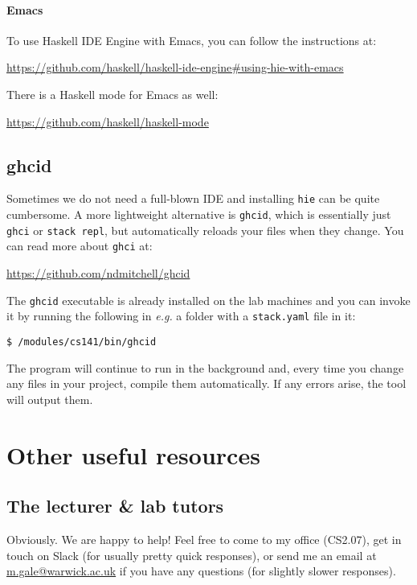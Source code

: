 \paragraph{Emacs} To use Haskell IDE Engine with Emacs, you can follow the instructions at:
\begin{center}
	\parbox{13cm}{\centering\url{https://github.com/haskell/haskell-ide-engine\#using-hie-with-emacs}}
\end{center}
There is a Haskell mode for Emacs as well:
\begin{center}
\url{https://github.com/haskell/haskell-mode}
\end{center}

\subsection{ghcid}

Sometimes we do not need a full-blown IDE and installing \texttt{\small hie} can be quite cumbersome. A more lightweight alternative is \texttt{\small ghcid}, which is essentially just \texttt{\small ghci} or \texttt{\small stack repl}, but automatically reloads your files when they change. You can read more about \texttt{\small ghci} at:
\begin{center}
	\url{https://github.com/ndmitchell/ghcid}
\end{center}
\pagebreak
The \texttt{\small ghcid} executable is already installed on the lab machines and you can invoke it by running the following in \emph{e.g.} a folder with a \texttt{\small stack.yaml} file in it:
\begin{verbatim}
$ /modules/cs141/bin/ghcid
\end{verbatim}
The program will continue to run in the background and, every time you change any files in your project, compile them automatically. If any errors arise, the tool will output them.

\section{Other useful resources}

\subsection{The lecturer \& lab tutors} 

Obviously. We are happy to help! Feel free to come to my office (CS2.07), get in touch on Slack (for usually pretty quick responses), or send me an email at \href{mailto:m.gale@warwick.ac.uk}{m.gale@warwick.ac.uk} if you have any questions (for slightly slower responses). 

